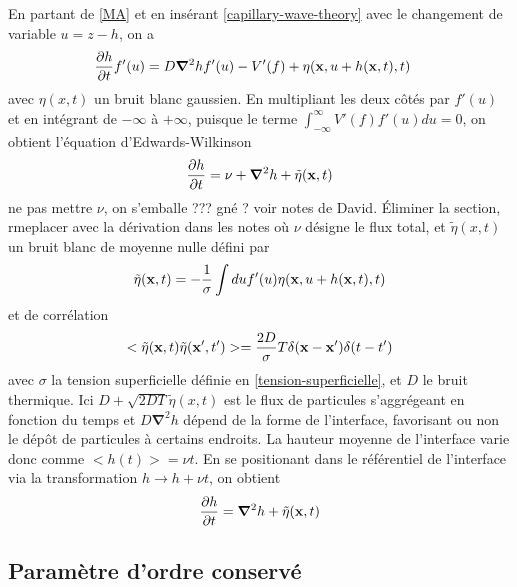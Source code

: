 En partant de \ref{MA} et en insérant \ref{capillary-wave-theory} avec le changement de variable $u= z-h$, on a \cite{bray_interface_2001}
\begin{align}
    \frac{\partial h}{\partial t} f'(u) &= D {\boldsymbol \nabla}^2 h f'(u) - V'(f) + \eta({\bf x},u+h({\bf x},t),t)
\end{align}
avec $\eta(x,t)$ un bruit blanc gaussien. En multipliant les deux côtés par $f'(u)$ et en intégrant de $-\infty$ à $+\infty$, puisque le terme $ \int_{-\infty}^\infty V'(f) f'(u) du = 0$, on obtient l'équation d'Edwards-Wilkinson \cite{edwards_surface_1982} 
\begin{align}
     \frac{\partial h}{\partial t} = \nu + {\boldsymbol \nabla}^2 h +  \tilde{\eta}({\bf x},t)
    \label{edwards-wilkinson}
\end{align}
{\color{red} ne pas mettre $\nu$, on s'emballe ??? gné ? voir notes de David. Éliminer la section, rmeplacer avec la dérivation dans les notes}
où $\nu$ désigne le flux total, et $\tilde{\eta}(x,t)$  un bruit blanc de moyenne nulle défini par
\begin{align}
    \tilde{\eta}({\bf x},t) = - \frac{1}{\sigma} \int du f'(u) \eta({\bf x},u+h({\bf x},t),t)
\end{align}
et de corrélation 
\begin{align}
    <\tilde{\eta}({\bf x},t)\tilde{\eta}({\bf x}',t')> = \frac{2 D}{\sigma} T\delta({\bf x}-{\bf x}')\delta(t-t')
\end{align}
avec $\sigma$ la tension superficielle définie en \ref{tension-superficielle}, et $D$ le bruit thermique.
Ici $D+ \sqrt{2 D T} \tilde{\eta}(x,t)$ est le flux de particules s'aggrégeant en fonction du temps et $D {\boldsymbol \nabla}^2 h$ dépend de la forme de l'interface, favorisant ou non le dépôt de particules à certains endroits.
La hauteur moyenne de l'interface varie donc comme $<h(t)> = \nu t$. En se positionant dans le référentiel de l'interface via la transformation $h \rightarrow h + \nu t$, on obtient
\begin{align}
     \frac{\partial h}{\partial t} =    {\boldsymbol \nabla}^2 h +  \tilde{\eta}({\bf x},t)
    \label{edwards-wilkinson-conesrved}
\end{align}

    \subsection{Paramètre d'ordre conservé}

